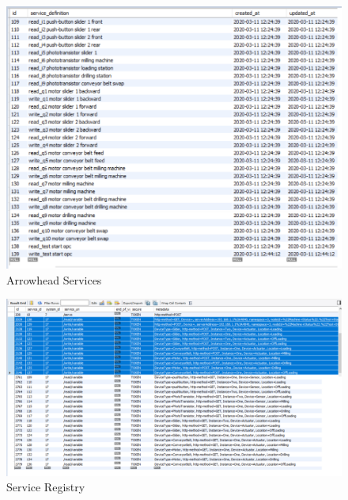 \begin{figure}[h]
\caption{Arrowhead Services}
\label{Figure 2.PNG}
\includegraphics[width=12cm]{Documentation/assemblyLine/sections/Images/Service_Definitions.PNG}
\end{figure}

\begin{figure}[h]
\caption{Service Registry}
\label{Figure 3.PNG}
\includegraphics[width=12cm]{Documentation/assemblyLine/sections/Images/ServiceRegistry.png}
\end{figure}
%